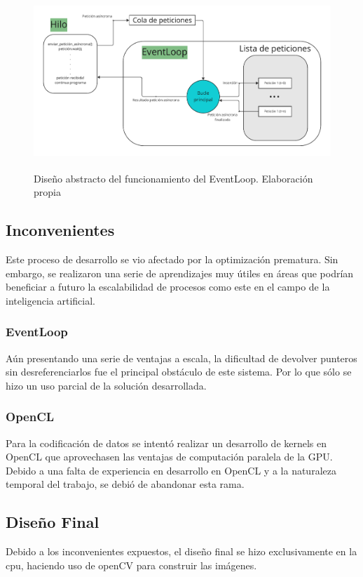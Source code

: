 \begin{figure}
    \centering
    \includegraphics[height=250px]{images/EventLoop.pdf}
    \caption{Diseño abstracto del funcionamiento del EventLoop. Elaboración propia}
    \label{diagramaEventLoop}
\end{figure}

\subsection{Inconvenientes}
Este proceso de desarrollo se vio afectado por la optimización prematura. Sin embargo, se realizaron una serie de aprendizajes muy útiles en áreas que podrían beneficiar a futuro la escalabilidad de procesos como este en el campo de la inteligencia artificial.
\subsubsection{EventLoop}
Aún presentando una serie de ventajas a escala, la dificultad de devolver punteros sin desreferenciarlos fue el principal obstáculo de este sistema. Por lo que sólo se hizo un uso parcial de la solución desarrollada. 
\subsubsection{OpenCL}
Para la codificación de datos se intentó realizar un desarrollo de kernels en OpenCL que aprovechasen las ventajas de computación paralela de la GPU. Debido a una falta de experiencia en desarrollo en OpenCL y a la naturaleza temporal del trabajo, se debió de abandonar esta rama.

\subsection{Diseño Final}
Debido a los inconvenientes expuestos, el diseño final se hizo exclusivamente en la cpu, haciendo uso de openCV para construir las imágenes.

